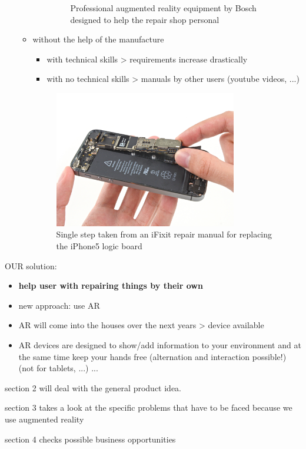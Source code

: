 \begin{itemize}
\begin{itemize}
\begin{itemize}
\begin{figure}[H]
						\centering
						\caption[Professional augmented reality equipment by Bosch designed to help the repair shop personal]{Professional augmented reality equipment by Bosch designed to help the repair shop personal\footnotemark}
					\end{figure}
			\end{itemize}
			\item without the help of the manufacture \begin{itemize}
				\itemsep0em
				\item with technical skills > requirements increase drastically
				\item with no technical skills > manuals by other users (youtube videos, ...)
			\end{itemize}
			\begin{figure}[H]
				\includegraphics[width=0.8\textwidth]{../images/ifixit-iphone-logicboard.jpg}
				\centering
				\caption[Single step taken from an iFixit repair manual for replacing the iPhone5 logic board]{Single step taken from an iFixit repair manual for replacing the iPhone5 logic board\footnotemark}
			\end{figure}
		\end{itemize}
	\end{itemize}
	
	OUR solution:
	\begin{itemize}
		\itemsep0em
		\item \textbf{help user with repairing things by their own}
		\item new approach: use AR
		\item AR will come into the houses over the next years > device available
		\item AR devices are designed to show/add information to your environment and at the same time keep your hands free (alternation and interaction possible!) (not for tablets, ...) ...
	\end{itemize}
	
	
	section 2 will deal with the general product idea.
	
	section 3 takes a look at the specific problems that have to be faced because we use augmented reality
	
	section 4 checks possible business opportunities

